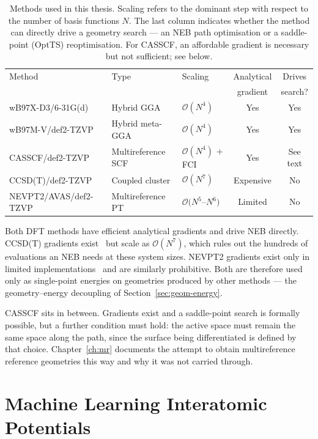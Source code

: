 \begin{table}[h]
\centering
\small
\setlength{\tabcolsep}{5pt}
\caption{Methods used in this thesis. Scaling refers to the dominant step with
respect to the number of basis functions $N$. The last column indicates whether
the method can directly drive a geometry search --- an NEB path optimisation or a
saddle-point (OptTS) reoptimisation. For CASSCF, an affordable gradient is
necessary but not sufficient; see below.}
\label{tab:gradient-availability}
\begin{tabular}{lllcc}
\hline
Method & Type & Scaling & Analytical & Drives \\
       &      &         & gradient   & search? \\
\hline
wB97X-D3/6-31G(d)     & Hybrid GGA         & $\mathcal{O}(N^4)$        & Yes       & Yes \\
wB97M-V/def2-TZVP     & Hybrid meta-GGA    & $\mathcal{O}(N^4)$        & Yes       & Yes \\
CASSCF/def2-TZVP      & Multireference SCF & $\mathcal{O}(N^4)$ + FCI  & Yes       & See text \\
CCSD(T)/def2-TZVP     & Coupled cluster    & $\mathcal{O}(N^7)$        & Expensive & No \\
NEVPT2/AVAS/def2-TZVP & Multireference PT  & $\mathcal{O}(N^5$--$N^6)$ & Limited   & No \\
\hline
\end{tabular}
\end{table}

Both DFT methods have efficient analytical gradients and drive NEB directly.
CCSD(T) gradients exist~\cite{scuseria1991} but scale as $\mathcal{O}(N^7)$, which
rules out the hundreds of evaluations an NEB needs at these system sizes. NEVPT2
gradients exist only in limited implementations~\cite{park2019} and are similarly
prohibitive. Both are therefore used only as single-point energies on geometries
produced by other methods --- the geometry--energy decoupling of
Section~\ref{sec:geom-energy}.

CASSCF sits in between. Gradients exist and a saddle-point search is formally
possible, but a further condition must hold: the active space must remain the same
space along the path, since the surface being differentiated is defined by that
choice. Chapter~\ref{ch:mr} documents the attempt to obtain multireference
reference geometries this way and why it was not carried through.
\section{Machine Learning Interatomic Potentials}
\label{sec:background-mlip}
 
